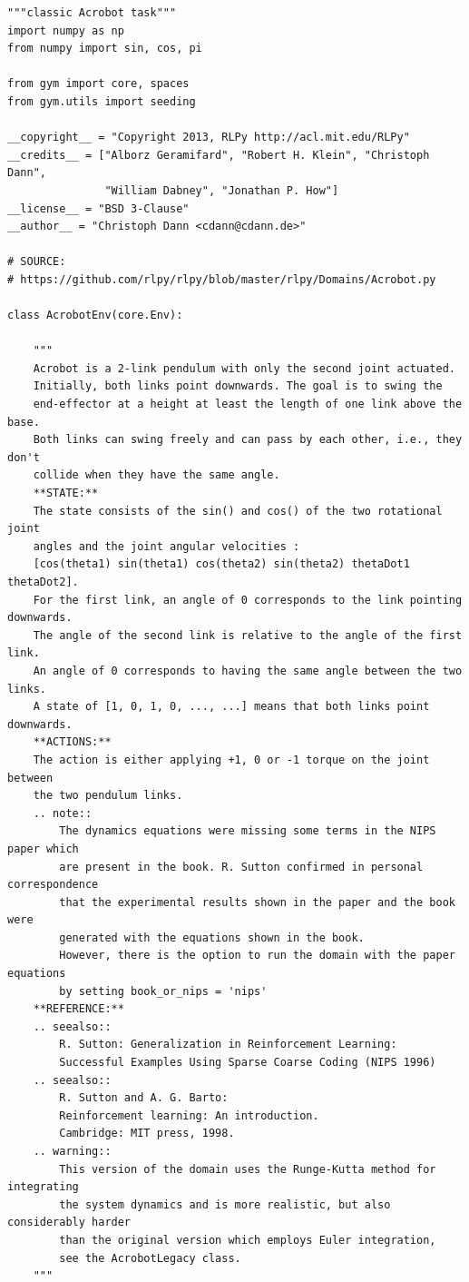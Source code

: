 \documentclass[cic,tc]{iiufrgs}
\newenvironment{longlisting}{\captionsetup{type=listing}}{}
\begin{document}
\begin{longlisting}
\begin{verbatim}
"""classic Acrobot task"""
import numpy as np
from numpy import sin, cos, pi

from gym import core, spaces
from gym.utils import seeding

__copyright__ = "Copyright 2013, RLPy http://acl.mit.edu/RLPy"
__credits__ = ["Alborz Geramifard", "Robert H. Klein", "Christoph Dann",
               "William Dabney", "Jonathan P. How"]
__license__ = "BSD 3-Clause"
__author__ = "Christoph Dann <cdann@cdann.de>"

# SOURCE:
# https://github.com/rlpy/rlpy/blob/master/rlpy/Domains/Acrobot.py

class AcrobotEnv(core.Env):

    """
    Acrobot is a 2-link pendulum with only the second joint actuated.
    Initially, both links point downwards. The goal is to swing the
    end-effector at a height at least the length of one link above the base.
    Both links can swing freely and can pass by each other, i.e., they don't
    collide when they have the same angle.
    **STATE:**
    The state consists of the sin() and cos() of the two rotational joint
    angles and the joint angular velocities :
    [cos(theta1) sin(theta1) cos(theta2) sin(theta2) thetaDot1 thetaDot2].
    For the first link, an angle of 0 corresponds to the link pointing downwards.
    The angle of the second link is relative to the angle of the first link.
    An angle of 0 corresponds to having the same angle between the two links.
    A state of [1, 0, 1, 0, ..., ...] means that both links point downwards.
    **ACTIONS:**
    The action is either applying +1, 0 or -1 torque on the joint between
    the two pendulum links.
    .. note::
        The dynamics equations were missing some terms in the NIPS paper which
        are present in the book. R. Sutton confirmed in personal correspondence
        that the experimental results shown in the paper and the book were
        generated with the equations shown in the book.
        However, there is the option to run the domain with the paper equations
        by setting book_or_nips = 'nips'
    **REFERENCE:**
    .. seealso::
        R. Sutton: Generalization in Reinforcement Learning:
        Successful Examples Using Sparse Coarse Coding (NIPS 1996)
    .. seealso::
        R. Sutton and A. G. Barto:
        Reinforcement learning: An introduction.
        Cambridge: MIT press, 1998.
    .. warning::
        This version of the domain uses the Runge-Kutta method for integrating
        the system dynamics and is more realistic, but also considerably harder
        than the original version which employs Euler integration,
        see the AcrobotLegacy class.
    """


\end{verbatim}
\end{longlisting}
\end{document}
